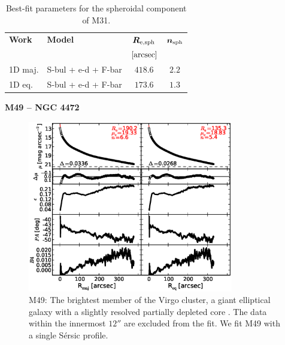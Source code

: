 \documentclass[preprint2]{emulateapj}
\newcommand{\fitfigurewidth}{0.8\textwidth}
\begin{document}
  \begin{table}[h]
  \small
  \caption{Best-fit parameters for the spheroidal component of M31.}
  \begin{center}
  \begin{tabular}{llcc}
  \hline
  {\bf Work} & {\bf Model}   & $\bm R_{\rm e,sph}$    & $\bm n_{\rm sph}$ \\
    &  &  $[\rm arcsec]$ & \\
  \hline
  1D maj. & S-bul + e-d + F-bar & $418.6$  &  $2.2$ \\
  1D eq.  & S-bul + e-d + F-bar & $173.6$  &  $1.3$ \\
  \hline
  \end{tabular}
  \end{center}
  \label{tab:m31}
  \end{table}

  \clearpage\newpage\noindent
  {\bf M49 -- NGC 4472 \\}
  
  \begin{figure}[h]
  \begin{center}
  \includegraphics[width=\fitfigurewidth]{m49_1Dfit.eps}
  \caption{M49:
  The brightest member of the Virgo cluster, a giant elliptical galaxy 
  with a slightly resolved partially depleted core \citep{rusli2013}.  %
  The data within the innermost $12''$ are excluded from the fit.
  We fit M49 with a single S\'ersic profile. 
  }
  \end{center}
  \end{figure}
\end{document}
